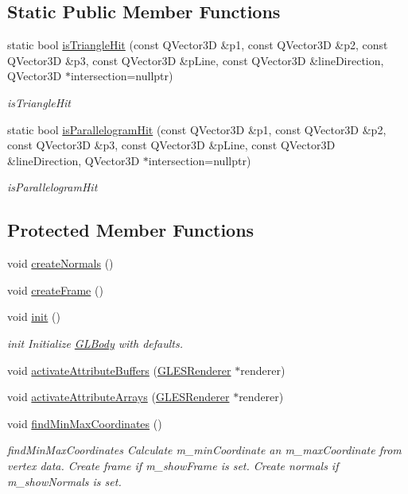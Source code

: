 \subsection*{Static Public Member Functions}
\begin{DoxyCompactItemize}
\item 
static bool \mbox{\hyperlink{class_g_l_body_aa06402c02671771961bf5dc5223fcd9d}{is\+Triangle\+Hit}} (const Q\+Vector3D \&p1, const Q\+Vector3D \&p2, const Q\+Vector3D \&p3, const Q\+Vector3D \&p\+Line, const Q\+Vector3D \&line\+Direction, Q\+Vector3D $\ast$intersection=nullptr)
\begin{DoxyCompactList}\small\item\em is\+Triangle\+Hit \end{DoxyCompactList}\item 
static bool \mbox{\hyperlink{class_g_l_body_ade0bd28b058f386bb326cbabcbf62be4}{is\+Parallelogram\+Hit}} (const Q\+Vector3D \&p1, const Q\+Vector3D \&p2, const Q\+Vector3D \&p3, const Q\+Vector3D \&p\+Line, const Q\+Vector3D \&line\+Direction, Q\+Vector3D $\ast$intersection=nullptr)
\begin{DoxyCompactList}\small\item\em is\+Parallelogram\+Hit \end{DoxyCompactList}\end{DoxyCompactItemize}
\subsection*{Protected Member Functions}
\begin{DoxyCompactItemize}
\item 
void \mbox{\hyperlink{class_g_l_body_ae306a6519ac1ad0903386ce9b9c511c5}{create\+Normals}} ()
\item 
void \mbox{\hyperlink{class_g_l_body_aac288828b1d2eb46f1e6750a696d557f}{create\+Frame}} ()
\item 
void \mbox{\hyperlink{class_g_l_body_a02b789838bb2c60008ba7878eb6bb28e}{init}} ()
\begin{DoxyCompactList}\small\item\em init Initialize \mbox{\hyperlink{class_g_l_body}{G\+L\+Body}} with defaults. \end{DoxyCompactList}\item 
void \mbox{\hyperlink{class_g_l_body_a35f619d585501cb1ac0945586afb9fa1}{activate\+Attribute\+Buffers}} (\mbox{\hyperlink{class_g_l_e_s_renderer}{G\+L\+E\+S\+Renderer}} $\ast$renderer)
\item 
void \mbox{\hyperlink{class_g_l_body_a2d1dcd40bdc2d1d50b70f2807a67f9a3}{activate\+Attribute\+Arrays}} (\mbox{\hyperlink{class_g_l_e_s_renderer}{G\+L\+E\+S\+Renderer}} $\ast$renderer)
\item 
void \mbox{\hyperlink{class_g_l_body_a780c5f3232c0c106dc81708ebe2c6228}{find\+Min\+Max\+Coordinates}} ()
\begin{DoxyCompactList}\small\item\em find\+Min\+Max\+Coordinates Calculate m\+\_\+min\+Coordinate an m\+\_\+max\+Coordinate from vertex data. Create frame if m\+\_\+show\+Frame is set. Create normals if m\+\_\+show\+Normals is set. \end{DoxyCompactList}\end{DoxyCompactItemize}
